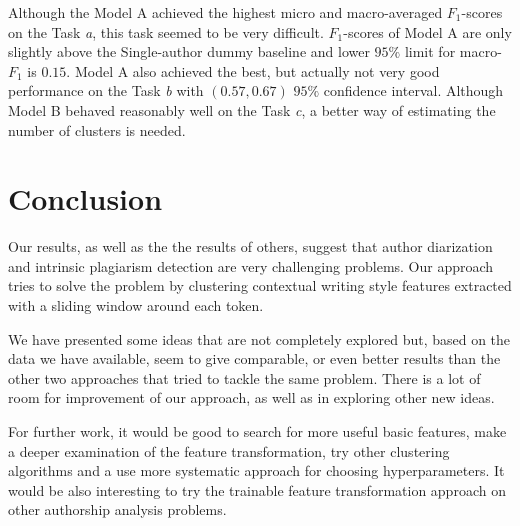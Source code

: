 \documentclass[10pt, a4paper]{article}
\begin{document}
Although the Model A achieved the highest micro and macro-averaged $F_1$-scores on the Task \emph{a}, this task seemed to be very difficult. $F_1$-scores of Model A are only slightly above the Single-author dummy baseline and lower $95\%$ limit for macro-$F_1$ is $0.15$. Model A also achieved the best, but actually not very good performance on the Task \emph{b} with $(0.57, 0.67)$ $95\%$ confidence interval. Although Model B behaved reasonably well on the Task \emph{c}, a better way of estimating the number of clusters is needed.


\section{Conclusion}

Our results, as well as the the results of others, suggest that author diarization and intrinsic plagiarism detection are very challenging problems. Our approach tries to solve the problem by clustering contextual writing style features extracted with a sliding window around each token. 

We have presented some ideas that are not completely explored but, based on the data we have available, seem to give comparable, or even better results than the other two approaches that tried to tackle the same problem. There is a lot of room for improvement of our approach, as well as in exploring other new ideas.

For further work, it would be good to search for more useful basic features, make a deeper examination of the feature transformation, try other clustering algorithms and a use more systematic approach for choosing hyperparameters. It would be also interesting to try the trainable feature transformation approach on other authorship analysis problems.




\end{document}
